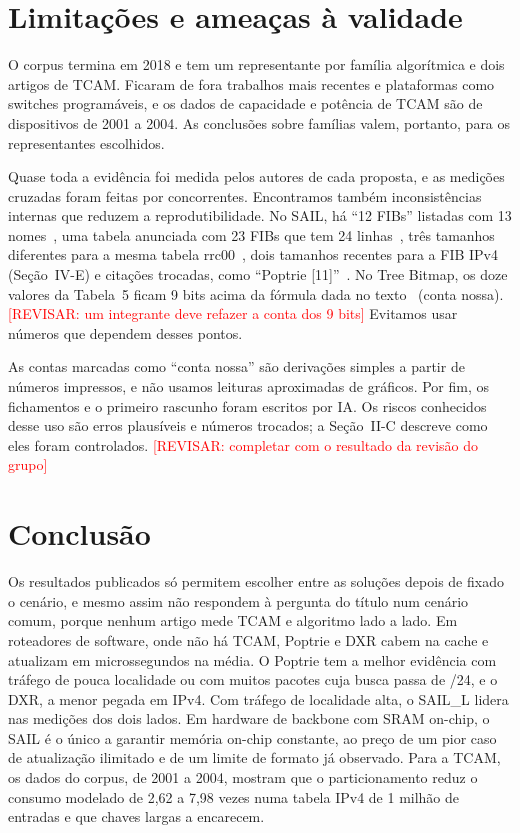 \documentclass[conference,a4paper]{IEEEtran}
\newcommand{\revisar}[1]{\textcolor{red}{[REVISAR: #1]}}
\begin{document}
\section{Limitações e ameaças à validade}

O corpus termina em 2018 e tem um representante por família algorítmica e dois artigos de TCAM. Ficaram de fora trabalhos
mais recentes e plataformas como switches programáveis, e os dados de capacidade e potência de TCAM são de dispositivos de
2001 a 2004. As conclusões sobre famílias valem, portanto, para os representantes escolhidos.

Quase toda a evidência foi medida pelos autores de cada proposta, e as medições cruzadas foram feitas por concorrentes.
Encontramos também inconsistências internas que reduzem a reprodutibilidade. No SAIL, há ``12 FIBs'' listadas com 13
nomes~\cite[\S VI-A]{yang18}, uma tabela anunciada com 23 FIBs que tem 24 linhas~\cite[Tab.~IV]{yang18}, três tamanhos
diferentes para a mesma tabela rrc00~\cite[\S VI-B, \S VII-C, Tab.~IV]{yang18}, dois tamanhos recentes para a FIB IPv4
(Seção~IV-E) e citações trocadas, como ``Poptrie [11]''~\cite[\S VI-C]{yang18}. No Tree Bitmap, os doze valores da
Tabela~5 ficam 9 bits acima da fórmula dada no texto~\cite[\S7.2]{eath04} (conta nossa). \revisar{um integrante deve
refazer a conta dos 9 bits} Evitamos usar números que dependem desses pontos.

As contas marcadas como ``conta nossa'' são derivações simples a partir de números impressos, e não usamos leituras
aproximadas de gráficos. Por fim, os fichamentos e o primeiro rascunho foram escritos por IA. Os riscos conhecidos desse
uso são erros plausíveis e números trocados; a Seção~II-C descreve como eles foram controlados.
\revisar{completar com o resultado da revisão do grupo}

\section{Conclusão}

Os resultados publicados só permitem escolher entre as soluções depois de fixado o cenário, e mesmo assim não respondem
à pergunta do título num cenário comum, porque nenhum artigo mede TCAM e algoritmo lado a lado. Em roteadores de software,
onde não há TCAM, Poptrie e DXR cabem na cache e atualizam em microssegundos na média. O Poptrie tem a melhor evidência com
tráfego de pouca localidade ou com muitos pacotes cuja busca passa de /24, e o DXR, a menor pegada em IPv4. Com tráfego de
localidade alta, o SAIL\_L lidera nas medições dos dois lados. Em hardware de backbone com SRAM on-chip, o SAIL é o único a
garantir memória on-chip constante, ao preço de um pior caso de atualização ilimitado e de um limite de formato já
observado. Para a TCAM, os dados do corpus, de 2001 a 2004, mostram que o particionamento reduz o consumo modelado de 2,62 a
7,98 vezes numa tabela IPv4 de 1 milhão de entradas e que chaves largas a encarecem.
\end{document}
